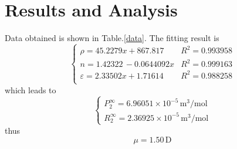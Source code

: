 \documentclass[%
 reprint,
 amsmath,amssymb,
 aps,
10.5pt,
]{revtex4-1}
\begin{document}
  \section{Results and Analysis}

\begin{table}
\caption{Physical constants measured of ethyl acetate - cyclohexane solutions in different molar ratio of ethyl acetate}
\label{data}
\end{table}
Data obtained is shown in Table.\ref{data}. The fitting result is 
\begin{equation}
\begin{cases}
\rho =  45.2279 x+867.817 & R^2 = 0.993958 \\
n =  1.42322\, - 0.0644092 x & R^2 = 0.999163 \\
\varepsilon =  2.33502 x+1.71614 & R^2 = 0.988258 \\
 \end{cases}
\end{equation}
which leads to 
\begin{equation}
  \begin{cases}
 P_2 ^\infty =  6.96051 \times 10^{-5} \,\mathrm{m^3/mol}\\
 R_2 ^\infty = 2.36925 \times 10^{-5} \,\mathrm{m^3/mol} 
  \end{cases}
\end{equation}
thus 
\begin{equation}
  \mu = 1.50 \, \mathrm{D}
\end{equation}
\end{document}
